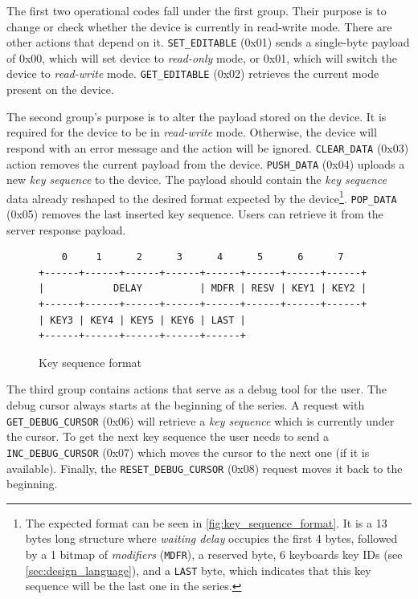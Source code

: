 The first two operational codes fall under the first group. Their purpose is to change or check whether the device is currently in read-write mode. There are other actions that depend on it. \verb|SET_EDITABLE| (0x01) sends a single-byte payload of 0x00, which will set device to \emph{read-only} mode, or 0x01, which will switch the device to \emph{read-write} mode. \verb|GET_EDITABLE| (0x02) retrieves the current mode present on the device.

The second group's purpose is to alter the payload stored on the device. It is required for the device to be in \emph{read-write} mode. Otherwise, the device will respond with an error message and the action will be ignored. \verb|CLEAR_DATA| (0x03) action removes the current payload from the device. \verb|PUSH_DATA| (0x04) uploads a new \emph{key sequence} to the device. The payload should contain the \emph{key sequence} data already reshaped to the desired format expected by the device\footnote{The expected format can be seen in \autoref{fig:key_sequence_format}. It is a 13 bytes long structure where \emph{waiting delay} occupies the first 4 bytes, followed by a 1 bitmap of \emph{modifiers} (\texttt{MDFR}), a reserved byte, 6 keyboards key IDs (see \autoref{sec:design_language}), and a \texttt{LAST} byte, which indicates that this key sequence will be the last one in the series.}. \verb|POP_DATA| (0x05) removes the last inserted key sequence. Users can retrieve it from the server response payload.

\begin{figure}[ht]
\centering
\begin{varwidth}{\linewidth}
\begin{verbatim}
    0     1      2      3      4      5      6      7
+------+------+------+------+------+------+------+------+
|            DELAY          | MDFR | RESV | KEY1 | KEY2 |
+------+------+------+------+------+------+------+------+
| KEY3 | KEY4 | KEY5 | KEY6 | LAST |
+------+------+------+------+------+
\end{verbatim}
\end{varwidth}
\caption{Key sequence format}
\label{fig:key_sequence_format}
\end{figure}

The third group contains actions that serve as a debug tool for the user. The debug cursor always starts at the beginning of the series. A request with \verb|GET_DEBUG_CURSOR| (0x06) will retrieve a \emph{key sequence} which is currently under the cursor. To get the next key sequence the user needs to send a \verb|INC_DEBUG_CURSOR| (0x07) which moves the cursor to the next one (if it is available). Finally, the \verb|RESET_DEBUG_CURSOR| (0x08) request moves it back to the beginning.

